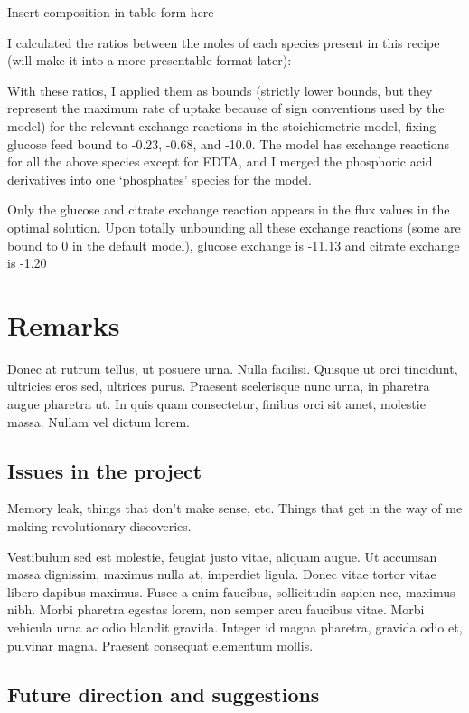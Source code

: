 \documentclass[parskip=full]{scrreprt}
\begin{document}
Insert composition in table form here

I calculated the ratios between the moles of each species present in this recipe (will make it into a more presentable format later):

With these ratios, I applied them as bounds (strictly lower bounds, but they represent the maximum rate of uptake because of sign conventions used by the model) for the relevant exchange reactions in the stoichiometric model, fixing glucose feed bound to -0.23, -0.68, and -10.0. The model has exchange reactions for all the above species except for EDTA, and I merged the phosphoric acid derivatives into one ‘phosphates’ species for the model.

Only the glucose and citrate exchange reaction appears in the flux values in the optimal solution. Upon totally unbounding all these exchange reactions (some are bound to 0 in the default model), glucose exchange is -11.13 and citrate exchange is -1.20

\chapter{Remarks}
\label{ch:remarks}

Donec at rutrum tellus, ut posuere urna. Nulla facilisi. Quisque ut orci tincidunt, ultricies eros sed, ultrices purus. Praesent scelerisque nunc urna, in pharetra augue pharetra ut. In quis quam consectetur, finibus orci sit amet, molestie massa. Nullam vel dictum lorem. 

\section{Issues in the project}
\label{sec:issues}

Memory leak, things that don't make sense, etc. Things that get in the way of me making revolutionary discoveries.

Vestibulum sed est molestie, feugiat justo vitae, aliquam augue. Ut accumsan massa dignissim, maximus nulla at, imperdiet ligula. Donec vitae tortor vitae libero dapibus maximus. Fusce a enim faucibus, sollicitudin sapien nec, maximus nibh. Morbi pharetra egestas lorem, non semper arcu faucibus vitae. Morbi vehicula urna ac odio blandit gravida. Integer id magna pharetra, gravida odio et, pulvinar magna. Praesent consequat elementum mollis.

\section{Future direction and suggestions}
\label{sec:future}
\end{document}
